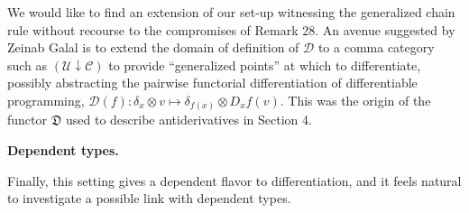 \documentclass[10pt,a4paper]{article}
\begin{document}
 
We would like to find an extension of our set-up witnessing the generalized chain rule without recourse to the compromises of Remark 28. An avenue suggested by Zeinab Galal is to extend the domain of definition of $\mathcal{D}$ to a comma category such as $(\mathcal{U}\downarrow\mathscr{C})$ to provide “generalized points” at which to differentiate, possibly abstracting the pairwise functorial differentiation of differentiable programming, $\mathcal{D}(f):\delta_{x}\otimes v\mapsto\delta_{f(x)}\otimes D_{x}f(v)$. This was the origin of the functor $\mathfrak{D}$ used to describe antiderivatives in Section 4.\par
 
 
 
 
\par\medskip\noindent\textbf{Dependent types.}\par
 
 
Finally, this setting gives a dependent flavor to differentiation, and it feels natural to investigate a possible link with dependent types.\par
 
 
 
\end{document}

